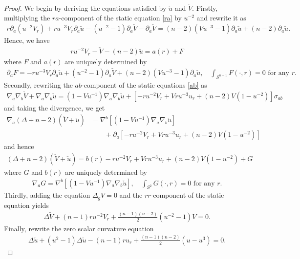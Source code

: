 \documentclass[12pt,twoside]{article}
\theoremstyle{plain}
\theoremstyle{definition}
\theoremstyle{remark}
\newcommand{\pl}{\partial}
\newcommand{\na}{\nabla}
\newcommand{\lt}{\left}
\newcommand{\rt}{\right}
\newcommand{\cu}{\check{u}}
\newcommand{\cV}{\check{V}}
\numberwithin{equation}{section}
\begin{document}
\begin{proof}

We begin by deriving the equations satisfied by $\cu$ and $\cV$. Firstly, multiplying the $ra$-component of the static equation \eqref{ra} by $u^{-2}$ and rewrite it as
\begin{align*}
r \pl_a \lt( u^{-2} V_r \rt) + ru^{-3} V_r \pl_a \cu - \lt( u^{-2}-1\rt) \pl_a \cV - \pl_a \cV = (n-2)\lt( Vu^{-3}-1 \rt)\pl_a \cu + (n-2)\pl_a \cu.
\end{align*}
Hence, we have
\begin{align}
ru^{-2} V_r - \cV - (n-2) \cu = a(r) + F \label{ra_rot}
\end{align}
where $F$ and $a(r)$ are uniquely determined by 
\begin{align}\label{F}
\pl_a F = - r u^{-3} V_r \pl_a \cu + (u^{-2}-1)\pl_a\cV + (n-2)(Vu^{-3}-1)\pl_a\cu, \quad \int_{S^{n-1}} F(\cdot, r) =0 \mbox{ for any }r.
\end{align}
Secondly, rewriting the $ab$-component of the static equations \eqref{ab} as
\begin{align*}
\na_a \na_b \cV + \na_a\na_b \cu = (1 - Vu^{-1})\na_a\na_b \cu + \lt[ -ru^{-2} V_r + V ru^{-3}u_r + (n-2)V (1 - u^{-2}) \rt]\sigma_{ab}
\end{align*}
and taking the divergence, we get
\begin{align*}
\na_a (\Delta+n-2)(\cV+\cu) &= \na^b \lt[ (1-Vu^{-1})\na_a\na_b \cu \rt] \\ &\qquad + \pl_a \lt[ -ru^{-2} V_r + V ru^{-3}u_r + (n-2)V(1 - u^{-2}) \rt]
\end{align*}
and hence
\begin{align}\label{ab_rot}
(\Delta+n-2)(\cV+\cu) = b(r) - ru^{-2}V_r + Vru^{-3}u_r + (n-2)V(1 - u^{-2}) + G
\end{align}
where $G$ and $b(r)$ are uniquely determined by
\begin{align}\label{G}
\na_a G = \na^b \lt[ (1-Vu^{-1})\na_a\na_b \cu \rt], \quad \int_{S^2} G(\cdot, r)=0 \mbox{ for any }r.
\end{align}
Thirdly, adding the equation $\Delta_g V =0$ and the $rr$-component of the static equation yields
\begin{align}\label{rr_rot}
\Delta \cV + (n-1)r u^{-2} V_r + \frac{(n-1)(n-2)}{2}(u^{-2}-1)V =0.
\end{align}
Finally, rewrite the zero scalar curvature equation
\begin{align}\label{zeroscalar_rot}
\Delta \cu + (u^2-1)\Delta \cu - (n-1)r u_r + \frac{(n-1)(n-2)}{2} (u - u^3) =0.
\end{align}


\end{proof}
\end{document}
